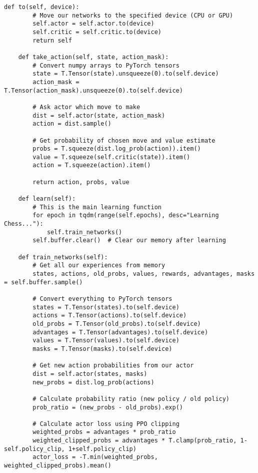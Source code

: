 \documentclass[11pt]{article}
\begin{document}
\begin{tcolorbox}[colback=cyan!5!white,colframe=cyan!75!black,title=Building the PPO Learning System,width=\textwidth]
\begin{minipage}{0.48\textwidth}
\begin{lstlisting}[style=Python,basicstyle=\ttfamily\scriptsize]
    def to(self, device):
        # Move our networks to the specified device (CPU or GPU)
        self.actor = self.actor.to(device)
        self.critic = self.critic.to(device)
        return self
    
    def take_action(self, state, action_mask):
        # Convert numpy arrays to PyTorch tensors
        state = T.Tensor(state).unsqueeze(0).to(self.device)
        action_mask = T.Tensor(action_mask).unsqueeze(0).to(self.device)
        
        # Ask actor which move to make
        dist = self.actor(state, action_mask)
        action = dist.sample()
        
        # Get probability of chosen move and value estimate
        probs = T.squeeze(dist.log_prob(action)).item()
        value = T.squeeze(self.critic(state)).item()
        action = T.squeeze(action).item()
        
        return action, probs, value
    
    def learn(self):
        # This is the main learning function
        for epoch in tqdm(range(self.epochs), desc="Learning Chess..."):
            self.train_networks()
        self.buffer.clear()  # Clear our memory after learning
    
    def train_networks(self):
        # Get all our experiences from memory
        states, actions, old_probs, values, rewards, advantages, masks = self.buffer.sample()
        
        # Convert everything to PyTorch tensors
        states = T.Tensor(states).to(self.device)
        actions = T.Tensor(actions).to(self.device)
        old_probs = T.Tensor(old_probs).to(self.device)
        advantages = T.Tensor(advantages).to(self.device)
        values = T.Tensor(values).to(self.device)
        masks = T.Tensor(masks).to(self.device)
        
        # Get new action probabilities from our actor
        dist = self.actor(states, masks)
        new_probs = dist.log_prob(actions)
        
        # Calculate probability ratio (new policy / old policy)
        prob_ratio = (new_probs - old_probs).exp()
        
        # Calculate actor loss using PPO clipping
        weighted_probs = advantages * prob_ratio
        weighted_clipped_probs = advantages * T.clamp(prob_ratio, 1-self.policy_clip, 1+self.policy_clip)
        actor_loss = -T.min(weighted_probs, weighted_clipped_probs).mean()
        

\end{lstlisting}
\end{minipage}
\end{tcolorbox}
\end{document}
